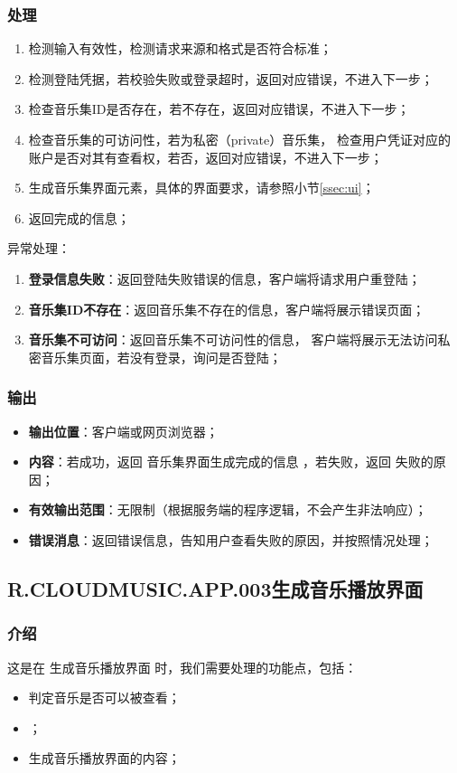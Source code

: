 \subsubsection{处理}
	\begin{enumerate}
		\item 检测输入有效性，检测请求来源和格式是否符合标准；
		\item 检测登陆凭据，若校验失败或登录超时，返回对应错误，不进入下一步；
		\item 检查音乐集ID是否存在，若不存在，返回对应错误，不进入下一步；
		\item 检查音乐集的可访问性，若为私密（private）音乐集，
			检查用户凭证对应的账户是否对其有查看权，若否，返回对应错误，不进入下一步；
		\item 生成音乐集界面元素，具体的界面要求，请参照小节\ref{ssec:ui}；
		\item 返回完成的信息；
	\end{enumerate}
	\noindent 异常处理：
	\begin{enumerate}
		\item \textbf{登录信息失败}：返回登陆失败错误的信息，客户端将请求用户重登陆；
		\item \textbf{音乐集ID不存在}：返回音乐集不存在的信息，客户端将展示错误页面；
		\item \textbf{音乐集不可访问}：返回音乐集不可访问性的信息，
			客户端将展示无法访问私密音乐集页面，若没有登录，询问是否登陆；
	\end{enumerate}
\subsubsection{输出}
\begin{itemize}
	\item \textbf{输出位置}：客户端或网页浏览器；
	\item \textbf{内容}：若成功，返回 音乐集界面生成完成的信息 ，若失败，返回 失败的原因；
	\item \textbf{有效输出范围}：无限制（根据服务端的程序逻辑，不会产生非法响应）；
	\item \textbf{错误消息}：返回错误信息，告知用户查看失败的原因，并按照情况处理；
\end{itemize}

\subsection{R.CLOUDMUSIC.APP.003生成音乐播放界面}
\subsubsection{介绍}
	这是在 生成音乐播放界面 时，我们需要处理的功能点，包括：
	\begin{itemize}
		\item 判定音乐是否可以被查看；
		\item {}；
		\item 生成音乐播放界面的内容；
	\end{itemize}
